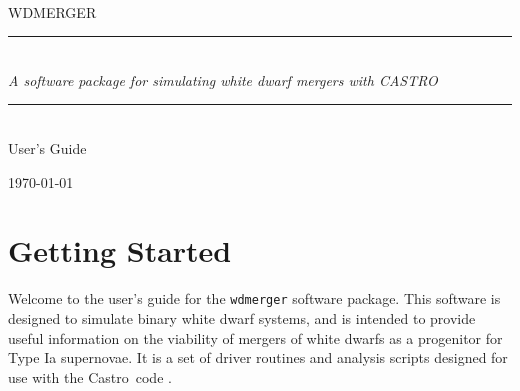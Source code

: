 \documentclass[12pt]{book}
\newcommand{\HRule}{\rule{\linewidth}{0.125mm}}
\newcommand{\castro}{{\sf Castro}}
\begin{document}
\newcommand\actaa{Acta Astron.}%
\newcommand\caa{Chinese Astron. Astrophys.}%
\newcommand\cjaa{Chinese J. Astron. Astrophys.}%
\newcommand\jcap{J. Cosmology Astropart. Phys.}%
\newcommand\na{New A}%
\newcommand\nar{New A Rev.}%
\newcommand\pasa{PASA}%
\newcommand\rmxaa{Rev. Mexicana Astron. Astrofis.}%


\frontmatter

\begin{titlepage}
\begin{center}
\ \\[3in]
{\sf \Huge WDMERGER} 

\begin{minipage}{5.5in}
\HRule\\[2mm]
\centering
{\Large \em A software package for simulating white dwarf mergers with CASTRO}

\HRule
\end{minipage}

\ \\[1 in]
{\sf \huge User's Guide}

\vfill

{\large \today}
\end{center}

\end{titlepage}



\tableofcontents

\mainmatter

\chapter{Getting Started}

Welcome to the user's guide for the \texttt{wdmerger} software package. This software is designed to
simulate binary white dwarf systems, and is intended to provide useful information on the 
viability of mergers of white dwarfs as a progenitor for Type Ia supernovae. It is a set of 
driver routines and analysis scripts designed for use with the \castro\ code \citep{castro}.
\end{document}
